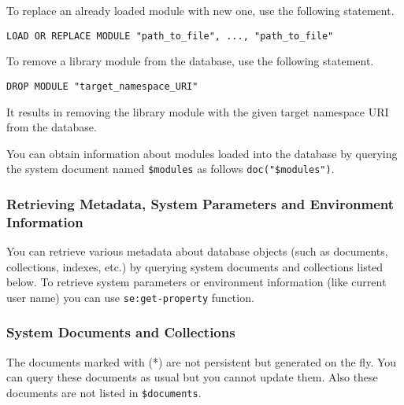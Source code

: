 \documentclass[a4paper,12pt]{article}
\begin{document}
To replace an already loaded module with new one, use the following statement.

\begin{verbatim}
LOAD OR REPLACE MODULE "path_to_file", ..., "path_to_file"
\end{verbatim}

To remove a library module from the database, use the following statement.

\begin{verbatim}
DROP MODULE "target_namespace_URI"
\end{verbatim}

It results in removing the library module with the given target namespace URI from the database.

You can obtain information about modules loaded into the database by querying the system document named \verb!$modules! as follows \verb!doc("$modules")!.


\subsubsection{Retrieving Metadata, System Parameters and Environment Information}
You can retrieve various metadata about database objects (such as documents, collections, indexes, etc.) by querying system documents and collections listed below.
To retrieve system parameters or environment information (like current user name) you can use \verb!se:get-property! function.

\subsubsection*{System Documents and Collections}

The documents marked with (*) are not persistent but generated on the fly. You can query these documents as usual but you cannot update them.
Also these documents are not listed in \verb!$documents!.
\end{document}
